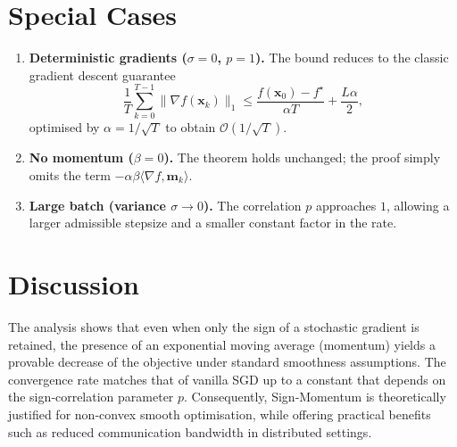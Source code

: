 \documentclass{article}
\begin{document}
\section*{Special Cases}
\begin{enumerate}[label=\alph*.]
\item \textbf{Deterministic gradients ($\sigma=0$, $p=1$).}  
The bound reduces to the classic gradient descent guarantee
\[
\frac{1}{T}\sum_{k=0}^{T-1}\|\nabla f(\mathbf{x}_{k})\|_{1}
\le \frac{f(\mathbf{x}_{0})-f^{\star}}{\alpha T}
+\frac{L\alpha}{2},
\]
optimised by $\alpha=1/\sqrt{T}$ to obtain $\mathcal{O}(1/\sqrt{T})$.
\item \textbf{No momentum ($\beta=0$).}  
The theorem holds unchanged; the proof simply omits the term $-\alpha\beta\langle\nabla f,\mathbf{m}_{k}\rangle$.
\item \textbf{Large batch (variance $\sigma\to0$).}  
The correlation $p$ approaches $1$, allowing a larger admissible stepsize and a smaller constant factor in the rate.
\end{enumerate}

\section*{Discussion}
The analysis shows that even when only the sign of a stochastic gradient is retained, the presence of an exponential moving average (momentum) yields a provable decrease of the objective under standard smoothness assumptions.  The convergence rate matches that of vanilla SGD up to a constant that depends on the sign‑correlation parameter $p$.  Consequently, Sign‑Momentum is theoretically justified for non‑convex smooth optimisation, while offering practical benefits such as reduced communication bandwidth in distributed settings.
\end{document}
